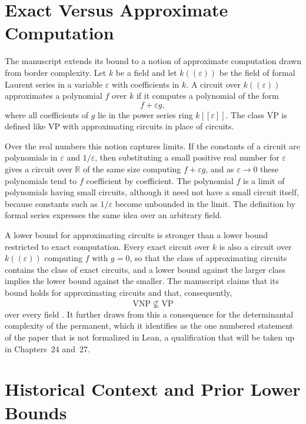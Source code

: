 \documentclass[11pt,letterpaper]{report}
\theoremstyle{plain}
\theoremstyle{definition}
\theoremstyle{remark}
\newcommand{\VP}{\mathrm{VP}}
\newcommand{\VNP}{\mathrm{VNP}}
\begin{document}
\section{Exact Versus Approximate Computation}

The manuscript extends its bound to a notion of approximate computation drawn from border complexity. Let $k$ be a field and let $k((\varepsilon))$ be the field of formal Laurent series in a variable $\varepsilon$ with coefficients in $k$. A circuit over $k((\varepsilon))$ approximates a polynomial $f$ over $k$ if it computes a polynomial of the form
\[
f+\varepsilon g,
\]
where all coefficients of $g$ lie in the power series ring $k[[\varepsilon]]$. The class $\overline{\VP}$ is defined like $\VP$ with approximating circuits in place of circuits.

Over the real numbers this notion captures limits. If the constants of a circuit are polynomials in $\varepsilon$ and $1/\varepsilon$, then substituting a small positive real number for $\varepsilon$ gives a circuit over $\mathbb R$ of the same size computing $f+\varepsilon g$, and as $\varepsilon\to0$ these polynomials tend to $f$ coefficient by coefficient. The polynomial $f$ is a limit of polynomials having small circuits, although it need not have a small circuit itself, because constants such as $1/\varepsilon$ become unbounded in the limit. The definition by formal series expresses the same idea over an arbitrary field.

A lower bound for approximating circuits is stronger than a lower bound restricted to exact computation. Every exact circuit over $k$ is also a circuit over $k((\varepsilon))$ computing $f$ with $g=0$, so that the class of approximating circuits contains the class of exact circuits, and a lower bound against the larger class implies the lower bound against the smaller. The manuscript claims that its bound holds for approximating circuits and that, consequently,
\[
\VNP\not\subseteq\overline{\VP}
\]
over every field \cite{Source2026}. It further draws from this a consequence for the determinantal complexity of the permanent, which it identifies as the one numbered statement of the paper that is not formalized in Lean, a qualification that will be taken up in Chapters~24 and~27.

\section{Historical Context and Prior Lower Bounds}
\end{document}
